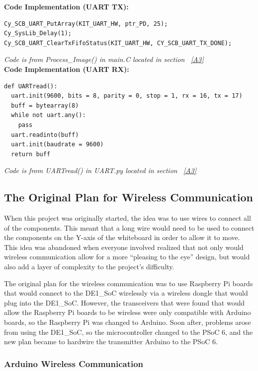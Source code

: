 \noindent \textbf{Code Implementation (UART TX):}
\begin{lstlisting} 
Cy_SCB_UART_PutArray(KIT_UART_HW, ptr_PD, 25);
Cy_SysLib_Delay(1);
Cy_SCB_UART_ClearTxFifoStatus(KIT_UART_HW, CY_SCB_UART_TX_DONE);
\end{lstlisting}
\textit{Code is from Process\_Image() in main.C located in section ~\ref{A3}}\\

\noindent \textbf{Code Implementation (UART RX):}
\begin{lstlisting} 
def UARTread():
  uart.init(9600, bits = 8, parity = 0, stop = 1, rx = 16, tx = 17)
  buff = bytearray(8)
  while not uart.any():
    pass
  uart.readinto(buff)
  uart.init(baudrate = 9600)
  return buff
\end{lstlisting}
\textit{Code is from UARTread() in UART.py located in section  ~\ref{A3}}

\subsection{The Original Plan for Wireless Communication}

When this project was originally started, the idea was to use wires to connect all of the components. This meant that a long wire would need to be used to connect the components on the Y-axis of the whiteboard in order to allow it to move. This idea was abandoned when everyone involved realized that not only would wireless communication allow for a more “pleasing to the eye” design, but would also add a layer of complexity to the project’s difficulty. \par
\setlength{\parindent}{2.5ex}
The original plan for the wireless communication was to use Raspberry Pi boards that would connect to the DE1\_SoC wirelessly via a wireless dongle that would plug into the DE1\_SoC. However, the transceivers that were found that would allow the Raspberry Pi boards to be wireless were only compatible with Arduino boards, so the Raspberry Pi was changed to Arduino. Soon after, problems arose from using the DE1\_SoC, so the microcontroller changed to the PSoC 6, and the new plan became to hardwire the transmitter Arduino to the PSoC 6. \\

\subsubsection{Arduino Wireless Communication}

